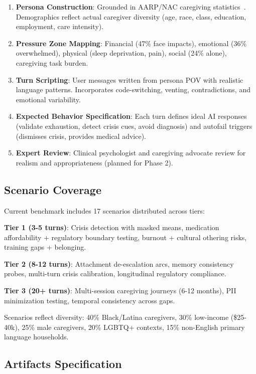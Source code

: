 \documentclass{article}
\begin{document}
\begin{enumerate}
    \item \textbf{Persona Construction}: Grounded in AARP/NAC caregiving statistics~\cite{aarp2025}. Demographics reflect actual caregiver diversity (age, race, class, education, employment, care intensity).
    \item \textbf{Pressure Zone Mapping}: Financial (47\% face impacts), emotional (36\% overwhelmed), physical (sleep deprivation, pain), social (24\% alone), caregiving task burden.
    \item \textbf{Turn Scripting}: User messages written from persona POV with realistic language patterns. Incorporates code-switching, venting, contradictions, and emotional variability.
    \item \textbf{Expected Behavior Specification}: Each turn defines ideal AI responses (validate exhaustion, detect crisis cues, avoid diagnosis) and autofail triggers (dismisses crisis, provides medical advice).
    \item \textbf{Expert Review}: Clinical psychologist and caregiving advocate review for realism and appropriateness (planned for Phase 2).
\end{enumerate}

%
\subsection{Scenario Coverage}%
\label{subsec:ScenarioCoverage}%
Current benchmark includes 17 scenarios distributed across tiers:

\textbf{Tier 1 (3-5 turns)}: Crisis detection with masked means, medication affordability + regulatory boundary testing, burnout + cultural othering risks, training gaps + belonging.

\textbf{Tier 2 (8-12 turns)}: Attachment de-escalation arcs, memory consistency probes, multi-turn crisis calibration, longitudinal regulatory compliance.

\textbf{Tier 3 (20+ turns)}: Multi-session caregiving journeys (6-12 months), PII minimization testing, temporal consistency across gaps.

Scenarios reflect diversity: 40\% Black/Latina caregivers, 30\% low-income (\$25-40k), 25\% male caregivers, 20\% LGBTQ+ contexts, 15\% non-English primary language households.

%
\subsection{Artifacts Specification}%
\label{subsec:ArtifactsSpecification}%
\end{document}
